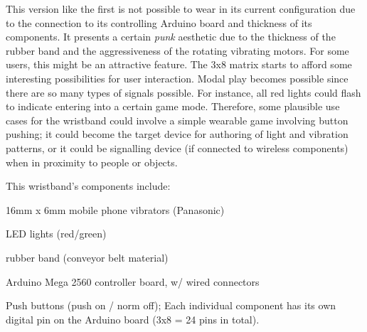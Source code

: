 \documentclass{chi-ext}
\begin{document}
This version like the first is not possible to wear in its current configuration due to the connection to its controlling Arduino board and thickness of its components. It presents a certain \emph{punk} aesthetic due to the thickness of the rubber band and the aggressiveness of the rotating vibrating motors. For some users, this might be an attractive feature. The 3x8 matrix starts to afford some interesting possibilities for user interaction. Modal play becomes possible since there are so many types of signals possible. For instance, all red lights could flash to indicate entering into a certain game mode. Therefore, some plausible use cases for the wristband could involve a simple wearable game involving button pushing; it could become the target device for authoring of light and vibration patterns, or it could be signalling device (if connected to wireless components) when in proximity to people or objects.

This wristband's components include:
\begin{inparaenum}
\item 16mm x 6mm mobile phone vibrators (Panasonic)
\item LED lights (red/green)
\item rubber band (conveyor belt material)
\item Arduino Mega 2560 controller board, w/ wired connectors
\item Push buttons (push on / norm off); Each individual component has its own digital pin on the Arduino board (3x8 = 24 pins in total).
\end{inparaenum}

\end{document}
